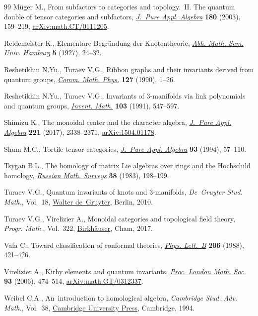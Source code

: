 \documentclass[10pt,a4paper]{amsart}
\numberwithin{equation}{section}
\begin{document}
\begin{thebibliography}{99}
M\"uger M., From subfactors to categories and topology.~{II}. {T}he quantum
 double of tensor categories and subfactors,
 \href{https://doi.org/10.1016/S0022-4049(02)00248-7}{\textit{J.~Pure Appl.
 Algebra}} \textbf{180} (2003), 159--219,
 \href{http://arxiv.org/abs/math.CT/0111205}{arXiv:math.CT/0111205}.

Reidemeister K., Elementare {B}egr\"undung der {K}notentheorie,
 \href{https://doi.org/10.1007/BF02952507}{\textit{Abh. Math. Sem. Univ.
 Hamburg}} \textbf{5} (1927), 24--32.

Reshetikhin N.Yu., Turaev V.G., Ribbon graphs and their invariants derived from
 quantum groups, \href{https://doi.org/10.1007/BF02096491}{\textit{Comm. Math.
 Phys.}} \textbf{127} (1990), 1--26.

Reshetikhin N.Yu., Turaev V.G., Invariants of {$3$}-manifolds via link
 polynomials and quantum groups,
 \href{https://doi.org/10.1007/BF01239527}{\textit{Invent. Math.}}
 \textbf{103} (1991), 547--597.

Shimizu K., The monoidal center and the character algebra,
 \href{https://doi.org/10.1016/j.jpaa.2016.12.037}{\textit{J.~Pure Appl.
 Algebra}} \textbf{221} (2017), 2338--2371,
 \href{http://arxiv.org/abs/1504.01178}{arXiv:1504.01178}.

Shum M.C., Tortile tensor categories,
 \href{https://doi.org/10.1016/0022-4049(92)00039-T}{\textit{J.~Pure Appl.
 Algebra}} \textbf{93} (1994), 57--110.

Tsygan B.L., The homology of matrix {L}ie algebras over rings and the
 {H}ochschild homology,
 \href{https://doi.org/10.1070/RM1983v038n02ABEH003481}{\textit{Russian Math.
 Surveys}} \textbf{38} (1983), 198--199.

Turaev V.G., Quantum invariants of knots and 3-manifolds, \textit{De~Gruyter
 Stud. Math.}, Vol.~18, \href{https://doi.org/10.1515/9783110221848}{Walter
 de~Gruyter}, Berlin, 2010.

Turaev V.G., Virelizier A., Monoidal categories and topological field theory,
 \textit{Progr. Math.}, Vol.~322,
 \href{https://doi.org/10.1007/978-3-319-49834-8}{Birkh\"auser}, Cham, 2017.

Vafa C., Toward classification of conformal theories,
 \href{https://doi.org/10.1016/0370-2693(88)91603-6}{\textit{Phys. Lett.~B}}
 \textbf{206} (1988), 421--426.

Virelizier A., Kirby elements and quantum invariants,
 \href{https://doi.org/10.1112/S0024611506015905}{\textit{Proc. London Math.
 Soc.}} \textbf{93} (2006), 474--514,
 \href{http://arxiv.org/abs/math.GT/0312337}{arXiv:math.GT/0312337}.

Weibel C.A., An~introduction to homological algebra, \textit{Cambridge Stud.
 Adv. Math.}, Vol.~38,
 \href{https://doi.org/10.1017/CBO9781139644136}{Cambridge University Press},
 Cambridge, 1994.

\end{thebibliography}
\end{document}
